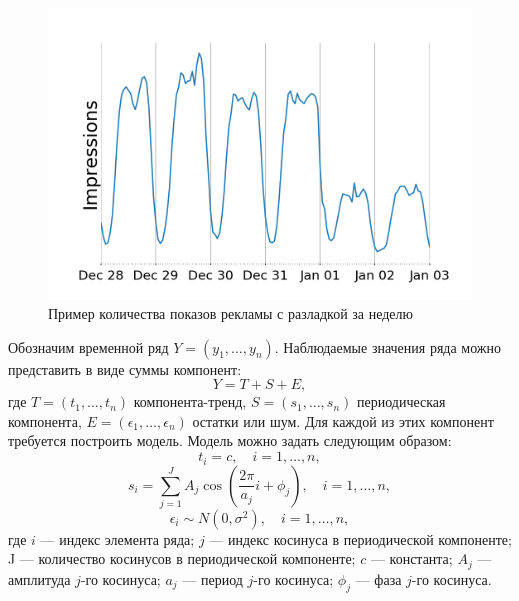 \documentclass[%
12pt,
master,  %
natbib,      %
subf,        %
substylefile = spbu.rtx,
href,        %
colorlinks,  %
]{disser}
\begin{document}
\begin{figure}[!hhh]
	\begin{center}
		\includegraphics[width=12cm]{cp_mean_2}
	\end{center}
	\vspace{-5mm}\caption{Пример количества показов рекламы с разладкой за неделю}
	\label{fig:examples_month}
\end{figure}

Обозначим временной ряд $Y = (y_1, \dots, y_n)$. Наблюдаемые значения ряда можно представить в виде суммы компонент:
\begin{equation*}
Y = T + S + E ,
\end{equation*}
где  $ T = (t_1, \dots, t_n) $ компонента-тренд, $ S = (s_1, \dots, s_n) $ периодическая компонента, $ E = (\epsilon_1, \dots, \epsilon_n) $ остатки или шум.
Для каждой из этих компонент требуется построить модель. Модель можно задать следующим образом:
\begin{equation*}
t_i = c, \quad i = 1, \dots, n, 
\end{equation*}
\begin{equation*}
s_i = \sum_{j=1}^{J}{A_j \cos \left( \frac{2\pi}{a_j} i + \phi_j \right)}, \quad i = 1, \dots, n,
\end{equation*}
\begin{equation*}
\epsilon_i \sim N(0, \sigma^2), \quad i = 1, \dots, n, 
\end{equation*}
где $i$ --- индекс элемента ряда; $j$ --- индекс косинуса в периодической компоненте; J --- количество косинусов в периодической компоненте; $c$ --- константа; $A_j$ --- амплитуда $j$-го косинуса; $a_j$ --- период $j$-го косинуса; $\phi_j$ --- фаза $j$-го косинуса.

\end{document}
